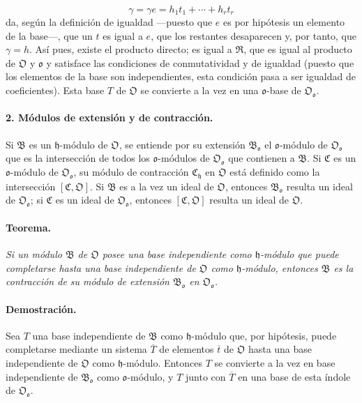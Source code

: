 \[
\gamma=\gamma e=h_1t_1+\cdots+h_rt_r
\]
da, según la definición de igualdad ---puesto que $e$ es por hipótesis un elemento de la base---, que un $t$ es igual a $e$, que los restantes desaparecen y, por tanto, que $\gamma=h$. Así pues, existe el producto directo; es igual a $\mathfrak R$, que es igual al producto de $\mathfrak O$ y $\mathfrak o$ y satisface las condiciones de conmutatividad y de igualdad (puesto que los elementos de la base son independientes, esta condición pasa a ser igualdad de coeficientes). Esta base $T$ de $\mathfrak O$ se convierte a la vez en una $\mathfrak o$-base de $\mathfrak O_{\mathfrak o}$.

\paragraph{2. Módulos de extensión y de contracción.}
Si $\mathfrak B$ es un $\mathfrak h$-módulo de $\mathfrak O$, se entiende por su extensión $\mathfrak B_{\mathfrak o}$ el $\mathfrak o$-módulo de $\mathfrak O_{\mathfrak o}$ que es la intersección de todos los $\mathfrak o$-módulos de $\mathfrak O_{\mathfrak o}$ que contienen a $\mathfrak B$. Si $\mathfrak C$ es un $\mathfrak o$-módulo de $\mathfrak O_{\mathfrak o}$, su módulo de contracción $\mathfrak C_{\mathfrak h}$ en $\mathfrak O$ está definido como la intersección $[\mathfrak C,\mathfrak O]$. Si $\mathfrak B$ es a la vez un ideal de $\mathfrak O$, entonces $\mathfrak B_{\mathfrak o}$ resulta un ideal de $\mathfrak O_{\mathfrak o}$; si $\mathfrak C$ es un ideal de $\mathfrak O_{\mathfrak o}$, entonces $[\mathfrak C,\mathfrak O]$ resulta un ideal de $\mathfrak O$.

\paragraph{Teorema.}
\emph{Si un módulo $\mathfrak B$ de $\mathfrak O$ posee una base independiente como $\mathfrak h$-módulo que puede completarse hasta una base independiente de $\mathfrak O$ como $\mathfrak h$-módulo, entonces $\mathfrak B$ es la contracción de su módulo de extensión $\mathfrak B_{\mathfrak o}$ en $\mathfrak O_{\mathfrak o}$.}

\paragraph{Demostración.}
Sea $T$ una base independiente de $\mathfrak B$ como $\mathfrak h$-módulo que, por hipótesis, puede completarse mediante un sistema $\overline T$ de elementos $\overline t$ de $\mathfrak O$ hasta una base independiente de $\mathfrak O$ como $\mathfrak h$-módulo. Entonces $T$ se convierte a la vez en base independiente de $\mathfrak B_{\mathfrak o}$ como $\mathfrak o$-módulo, y $T$ junto con $\overline T$ en una base de esta índole de $\mathfrak O_{\mathfrak o}$.

